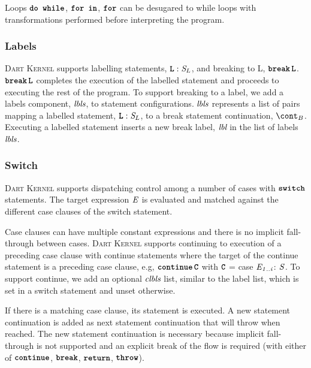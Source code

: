 \documentclass[a4paper,oneside,fleqn]{article}
\newcommand{\kernel}{\textsc{Dart Kernel}}
\newcommand{\synt}[1]{\ensuremath{\text{\textbf{\texttt{#1}}}}}
\DeclareMathOperator{\dowhile}{\synt{do~while}}
\DeclareMathOperator{\forin}{\synt{for~in}}
\DeclareMathOperator{\for}{\synt{for}}
\DeclareMathOperator{\throw}{\synt{throw}}
\DeclareMathOperator{\bbreak}{\synt{break}}
\DeclareMathOperator{\switch}{\synt{switch}}
\DeclareMathOperator{\continue}{\synt{continue}}
\DeclareMathOperator{\return}{\synt{return}}
\begin{document}
Loops $\dowhile$, $\forin$, $\for$ can be desugared to while loops with transformations performed before interpreting the program.


\subsubsection{Labels}

\kernel{} supports labelling statements, $\synt{L}: \stmt_{L}$, and breaking to L, $\bbreak \synt{L}$.
$\bbreak \synt{L}$ completes the execution of the labelled statement and proceeds to executing the rest of the program.
To support breaking to a label, we add a labels component, $\textit{lbls}$, to statement configurations.
$\textit{lbls}$ represents a list of pairs mapping a labelled statement, $\synt{L}: \stmt_L$, to a break statement continuation, $\bcont$.
Executing a labelled statement inserts a new break label, $\textit{lbl}$ in the list of labels $\textit{lbls}$.


\subsubsection{Switch}

\kernel{} supports dispatching control among a number of cases with $\switch$ statements.
The target expression $\mathit{E}$ is evaluated and matched against the different case clauses of the switch statement.

Case clauses can have multiple constant expressions and there is no implicit fall-through between cases.
\kernel{} supports continuing to execution of a preceding case clause with continue statements where the target of the continue statement is a preceding case clause, e.g, $\continue \synt{C}$ with $\synt{C}$ = case $\mathit{E}_\mathit{1..i}$: $\mathit{S}$.
To support continue, we add an optional $\textit{clbls}$ list, similar to the label list, which is set in a switch statement and unset otherwise.

If there is a matching case clause, its statement is executed.
A new statement continuation is added as next statement continuation that will throw when reached.
The new statement continuation is necessary because implicit fall-through is not supported and an explicit break of the flow is required (with either of $\continue$, $\bbreak$, $\return$, $\throw$).
\end{document}
